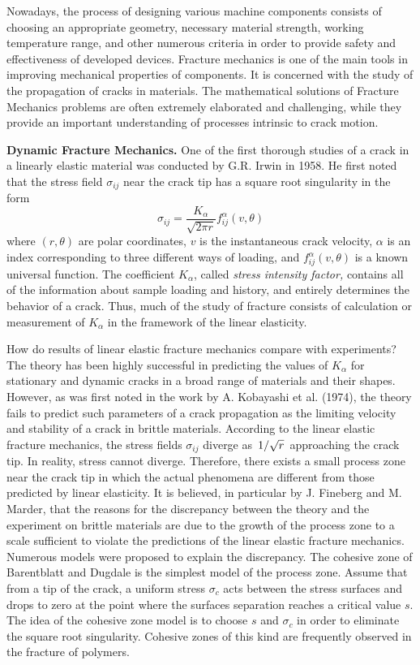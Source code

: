 \documentclass[11pt]{amsart}
\begin{document}
\bigskip

Nowadays, the process of designing various machine components consists of choosing an appropriate geometry, necessary material strength, working temperature range, and other numerous criteria in order to provide safety and effectiveness of developed devices. Fracture mechanics is one of the main tools in improving mechanical properties of components. It is concerned with the study of the propagation of cracks in materials. The mathematical solutions of Fracture Mechanics problems are often extremely elaborated and challenging, while they provide an important understanding of processes intrinsic to crack motion. 

\bigskip

\textbf{Dynamic Fracture Mechanics.} One of the first thorough studies of a crack in a linearly elastic material was conducted by G.R. Irwin in 1958. He first noted that the stress field $\sigma_{ij}$ near the crack tip has a square root singularity in the form
$$
	\sigma_{ij}=\frac{K_\alpha}{\sqrt{2\pi r}}f^\alpha_{ij}(v,\theta)
$$
where $(r,\theta)$ are polar coordinates, $v$ is the instantaneous crack velocity, $\alpha$ is an index corresponding to three different ways of loading, and $f_{ij}^\alpha(v,\theta)$ is a known universal function. The coefficient $K_\alpha$, called \emph{stress intensity factor,} contains all of the information about sample loading and history, and entirely determines the behavior of a crack. Thus, much of the study of fracture consists of calculation or measurement of $K_\alpha$ in the framework of the linear elasticity.

How do results of linear elastic fracture mechanics compare with experiments? The theory has been highly successful in predicting the values of $K_\alpha$ for stationary and dynamic cracks in a broad range of materials and their shapes. However, as was first noted in the work by A. Kobayashi et al. (1974), the theory fails to predict such parameters of a crack propagation as the limiting velocity and stability of a crack in brittle materials. According to the linear elastic fracture mechanics, the stress fields $\sigma_{ij}$ diverge as $\left.1\middle/\sqrt{r}\right.$ approaching the crack tip. In reality, stress cannot diverge. Therefore, there exists a small process zone near the crack tip in which the actual phenomena are different from those predicted by linear elasticity. It is believed, in particular by J. Fineberg and M. Marder, that the reasons for the discrepancy between the theory and the experiment on brittle materials are due to the growth of the process zone to a scale sufficient to violate the predictions of the linear elastic fracture mechanics. Numerous models were proposed to explain the discrepancy. The cohesive zone of Barentblatt and Dugdale is the simplest model of the process zone. Assume that from a tip of the crack, a uniform stress $\sigma_c$ acts between the stress surfaces and drops to zero at the point where the surfaces separation reaches a critical value $s$. The idea of the cohesive zone model is to choose $s$ and $\sigma_c$ in order to eliminate the square root singularity. Cohesive zones of this kind are frequently observed in the fracture of polymers. 
\end{document}
